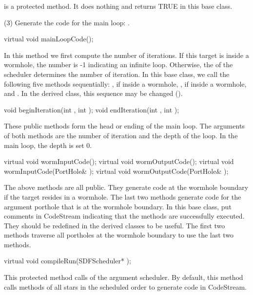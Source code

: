 is a protected method. It does nothing and returns TRUE in this
base class.

(3) Generate the code for the main loop: .

\begin{example}
virtual void mainLoopCode();
\end{example}

In this method we first compute the number of iterations. If this
target is inside a wormhole, the number is -1 indicating an infinite
loop. Otherwise, the  of the scheduler determines the number
of iteration.  In this base class, we call the following five methods
sequentially: ,  if inside a 
wormhole, ,  if inside a wormhole, and
. In the derived class, this sequence may be changed
().

\begin{example}
void beginIteration(int , int );
void endIteration(int , int );
\end{example}

These public methods form the head or ending of the main loop. The
arguments of both methods are the number of iteration and the depth of
the loop. In the main loop, the depth is set 0.

\begin{example}
virtual void wormInputCode();
virtual void wormOutputCode();
virtual void wormInputCode(PortHole& );
virtual void wormOutputCode(PortHole& );
\end{example}

The above methods are all public. They generate code at the wormhole
boundary if the target resides in a wormhole. The last two methods
generate code for the argument porthole that is at the wormhole
boundary. In this base class, put comments in  CodeStream
indicating that the methods are successfully executed. They should be
redefined in the derived classes to be useful. The first two methods
traverse all portholes at the wormhole boundary to use the last two
methods.

\begin{example}
virtual void compileRun(SDFScheduler* );
\end{example}

This protected method calls  of the argument scheduler. 
By default, this method calls  methods of all stars in the
scheduled order to generate code in  CodeStream.

